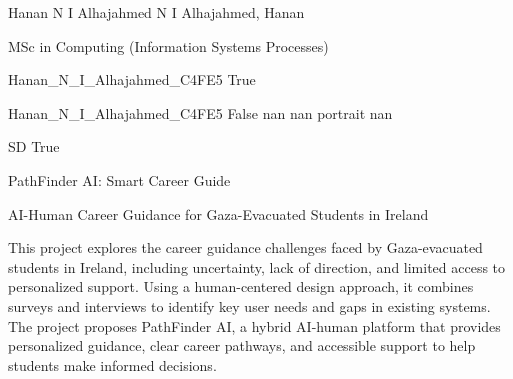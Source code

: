 
\begingroup{}\relax



\def\Key{Hanan_N_I_Alhajahmed_C4FE5}

{Hanan N I Alhajahmed}
{N I Alhajahmed, Hanan}

{MSc in Computing (Information Systems Processes)}

{Hanan_N_I_Alhajahmed_C4FE5}
{True}

{Hanan_N_I_Alhajahmed_C4FE5}
{False}
{nan}
{nan}
{portrait}
{nan}

{SD}
{True}

{PathFinder AI: Smart Career Guide}

{AI-Human Career Guidance for Gaza-Evacuated Students in Ireland}

{This project explores the career guidance challenges faced by Gaza-evacuated students in Ireland, including uncertainty, lack of direction, and limited access to personalized support. Using a human-centered design approach, it combines surveys and interviews to identify key user needs and gaps in existing systems. The project proposes PathFinder AI, a hybrid AI-human platform that provides personalized guidance, clear career pathways, and accessible support to help students make informed decisions.}

